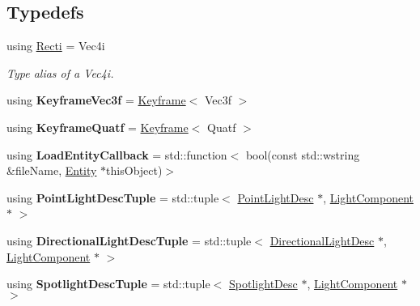 \subsection*{Typedefs}
\begin{DoxyCompactItemize}
\item 
\mbox{\label{namespace_blade_ac765e9c5c8205009994e4243d9d6f81c}} 
using \hyperlink{namespace_blade_ac765e9c5c8205009994e4243d9d6f81c}{Recti} = Vec4i
\begin{DoxyCompactList}\small\item\em Type alias of a Vec4i. \end{DoxyCompactList}\item 
\mbox{\label{namespace_blade_aa7e67aae03c0c670ec581992473709df}} 
using {\bfseries Keyframe\+Vec3f} = \hyperlink{struct_blade_1_1_keyframe}{Keyframe}$<$ Vec3f $>$
\item 
\mbox{\label{namespace_blade_a0515cabf5dce42be342f3c03ac97fb77}} 
using {\bfseries Keyframe\+Quatf} = \hyperlink{struct_blade_1_1_keyframe}{Keyframe}$<$ Quatf $>$
\item 
\mbox{\label{namespace_blade_ae4427d76c4fffafaecffc77fcf0daffe}} 
using {\bfseries Load\+Entity\+Callback} = std\+::function$<$ bool(const std\+::wstring \&file\+Name, \hyperlink{class_blade_1_1_entity}{Entity} $\ast$this\+Object)$>$
\item 
\mbox{\label{namespace_blade_a37179ac0718aba4bfa4db788b9d97b75}} 
using {\bfseries Point\+Light\+Desc\+Tuple} = std\+::tuple$<$ \hyperlink{struct_blade_1_1_point_light_desc}{Point\+Light\+Desc} $\ast$, \hyperlink{class_blade_1_1_light_component}{Light\+Component} $\ast$ $>$
\item 
\mbox{\label{namespace_blade_a981bb7d30e9c435886e1e3414f1d3bd5}} 
using {\bfseries Directional\+Light\+Desc\+Tuple} = std\+::tuple$<$ \hyperlink{struct_blade_1_1_directional_light_desc}{Directional\+Light\+Desc} $\ast$, \hyperlink{class_blade_1_1_light_component}{Light\+Component} $\ast$ $>$
\item 
\mbox{\label{namespace_blade_acefa6ee11c924af0c6e0c9ce851608bd}} 
using {\bfseries Spotlight\+Desc\+Tuple} = std\+::tuple$<$ \hyperlink{struct_blade_1_1_spotlight_desc}{Spotlight\+Desc} $\ast$, \hyperlink{class_blade_1_1_light_component}{Light\+Component} $\ast$ $>$

\end{DoxyCompactItemize}
